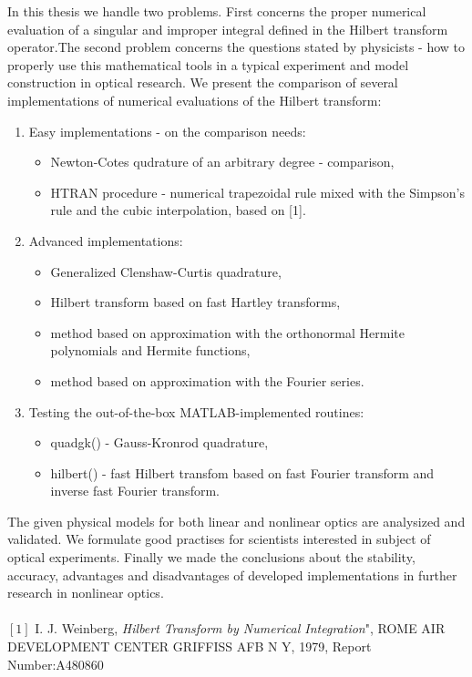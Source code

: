 \documentclass[10pt,twoside,a4paper]{article}
\begin{document}
In this thesis we handle two problems. First concerns the proper
numerical evaluation of a singular and improper integral defined in
the Hilbert transform operator.The second problem concerns the
questions stated by physicists - how to properly use this mathematical
tools in a typical experiment and model construction in optical
research. We present the comparison of several implementations of
numerical evaluations of the Hilbert transform:
\begin{enumerate}
 \item Easy implementations - on the comparison needs:
  \begin{itemize}
   \item Newton-Cotes qudrature of an arbitrary degree - comparison,
   \item HTRAN procedure - numerical trapezoidal rule mixed with the
Simpson's rule and the cubic interpolation, based on [1].
  \end{itemize}
 \item Advanced implementations:
  \begin{itemize}
   \item Generalized Clenshaw-Curtis quadrature,
   \item Hilbert transform based on fast Hartley transforms,
   \item method based on approximation with the orthonormal Hermite
polynomials and Hermite functions,
   \item method based on approximation with the Fourier series.
  \end{itemize}
 \item Testing the out-of-the-box MATLAB-implemented routines:
  \begin{itemize}
   \item quadgk() - Gauss-Kronrod quadrature,
   \item hilbert() - fast Hilbert transfom based on fast Fourier transform
and inverse fast Fourier transform.
  \end{itemize}
\end{enumerate}

The given physical models for both linear and nonlinear optics are
analysized and validated. We formulate good practises for scientists
interested in subject of optical experiments. Finally we made the
conclusions about the stability, accuracy, advantages and
disadvantages of developed implementations in further research in
nonlinear optics.
\\ \\ 
$[1]$ I. J. Weinberg, \textit{Hilbert Transform by Numerical
Integration}", ROME AIR DEVELOPMENT CENTER GRIFFISS AFB N Y, 1979,
Report Number:A480860
\end{document}
